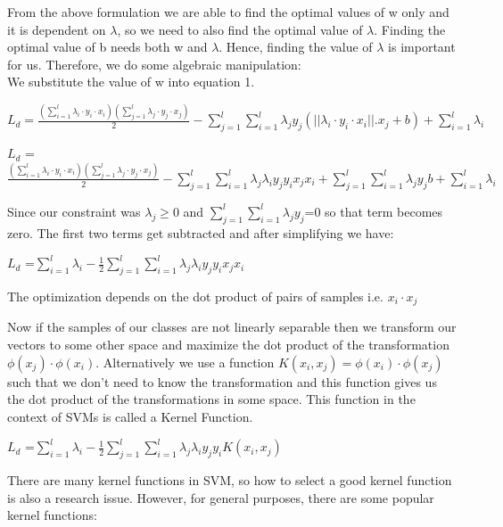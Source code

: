 \documentclass[hidelinks,12pt]{article}
\begin{document}
	From the above formulation we are able to find the optimal values of w only and it is dependent on $\lambda$, so we need to  also find the optimal value of $\lambda$. Finding the optimal value of b needs both w and $\lambda$. Hence, finding the value of $\lambda$ is important for us. Therefore, we do some algebraic manipulation:
	\\

	We substitute the value of w into equation 1. 

	\begin{center}
	$L_d = \frac{ (\sum_{i=1}^l\lambda_i \cdot y_i \cdot x_i)(\sum_{j=1}^l\lambda_j \cdot y_j \cdot x_j)}{2}-\sum_{j=1}^l\sum_{i=1}^l\lambda_j y_j(||\lambda_i \cdot y_i \cdot x_i||.x_j+b)+\sum_{i=1}^l \lambda_i$
	\end{center}
	\begin{center}
	    $L_d$ =$ \frac{(\sum_{i=1}^l\lambda_i \cdot y_i \cdot x_i)(\sum_{j=1}^l\lambda_j \cdot y_j \cdot x_j)}{2}-\sum_{j=1}^l\sum_{i=1}^l\lambda_j\lambda_i y_j y_i x_j x_i+\sum_{j=1}^l\sum_{i=1}^l\lambda_j y_j b+\sum_{i=1}^l \lambda_i$
	\end{center}
	Since our constraint was $\lambda_j \geq 0$ and $\sum_{j=1}^l\sum_{i=1}^l\lambda_j y_j$=0 so that term becomes zero. The first two terms get subtracted and after simplifying we have:
	\begin{center}
	    $L_d$ =$ \sum_{i=1}^l \lambda_i-\frac{1}{2}\sum_{j=1}^l\sum_{i=1}^l\lambda_j\lambda_i y_j y_i x_j x_i$
	\end{center}
	The optimization depends on the dot product of pairs of samples i.e. $x_i \cdot x_j$

	Now if the samples of our classes are not linearly separable then we transform our vectors to some other space and maximize the dot product of the transformation $\phi(x_j)\cdot\phi(x_i)$. Alternatively we use a function $K(x_i,x_j)=\phi(x_i)\cdot\phi(x_j)$ such that we don't need to know the transformation and this function gives us the dot product of the transformations in some space. This function in the context of SVMs is called a Kernel Function.
	\begin{center}
	    $L_d$ =$ \sum_{i=1}^l \lambda_i-\frac{1}{2}\sum_{j=1}^l\sum_{i=1}^l\lambda_j\lambda_i y_j y_i K(x_i, x_j)$
	\end{center}
	There are many kernel functions in SVM, so how to select a good kernel function is also a research issue. However, for general purposes, there are some popular kernel functions:
	\\
\end{document}
